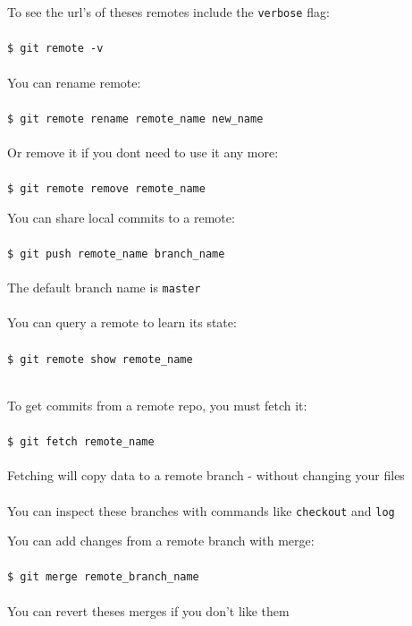 \documentclass{beamer}
\begin{document}
\begin{frame}[allowframebreaks]{\secname}
    To see the url's of theses remotes include the {\tt verbose} flag: \\~\\

    {\tt \$ git remote -v} \\~\\

    You can rename remote:\\~\\
    {\tt \$ git remote rename remote\_name new\_name} \\~\\

    Or remove it if you dont need to use it any more: \\~\\

    {\tt \$ git remote remove remote\_name}

\framebreak

    You can share local commits to a remote: \\~\\

    {\tt \$ git push remote\_name branch\_name} \\~\\

    The default branch name is {\tt master} \\~\\

    You can query a remote to learn its state: \\~\\

    {\tt \$ git remote show remote\_name} \\~\\

\framebreak

    To get commits from a remote repo, you must fetch it:\\~\\

    {\tt \$ git fetch remote\_name} \\~\\

    Fetching will copy data to a remote branch - without changing your
    files\\~\\
    
    You can inspect these branches with commands like {\tt checkout}
    and {\tt log}
    
\framebreak

    You can add changes from a remote branch with merge: \\~\\

    {\tt \$ git merge remote\_branch\_name} \\~\\

    You can revert theses merges if you don't like them
    \end{frame}
\end{document}
